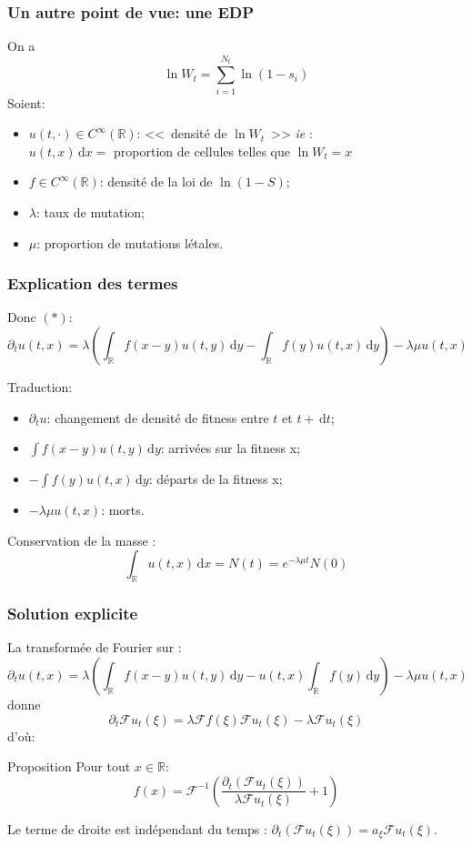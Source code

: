 \documentclass{beamer}
\newcommand{\prop}[1]{\begin{block}{Proposition}#1\end{block}}
\newcommand{\pth}[1]{\left(#1\right)}
\newcommand{\ie}{\emph{ie} }
\newcommand{\de}{\,\text{d}}
\newcommand{\Er}{\mathbb{R}}
\newcommand{\dr}{\partial}
\newcommand{\fr}{\mathcal{F}}
\begin{document}
\begin{frame}
  \frametitle{Un autre point de vue: une EDP}

  On a \[\ln W_t=\sum_{i=1}^{N_t}\ln(1-s_i)\]
  Soient:
\begin{itemize}[label=$\bullet$]
\item $u(t,\cdot)\in C^{\infty}(\Er)$: <<~densité de $\ln W_t$~>> \ie: \\$u(t,x)\de x=$ proportion de cellules telles que $\ln W_t=x$%
\item $f\in C^{\infty}(\Er)$: densité de la loi de $\ln(1-S)$;\vspace{0.5cm}\pause
\item $\lambda$: taux de mutation;
\item $\mu$: proportion de mutations létales.
\end{itemize}

\end{frame}
\begin{frame}
  \frametitle{Explication des termes}

Donc $(*)$:
\[\dr_tu(t,x)=\lambda\pth{\int_{\Er}f(x-y)u(t,y)\de y-\int_{\Er}f(y)u(t,x)\de y}-\lambda\mu u(t,x)\]

\vspace{0.5cm}

Traduction:
\begin{itemize}[label=$\bullet$]
\item $\dr_tu$: changement de densité de fitness entre $t$ et $t+\de t$;
\item $\int f(x-y)u(t,y)\de y$: arrivées sur la fitness x;
\item $-\int f(y)u(t,x)\de y$: départs de la fitness x;
\item $-\lambda\mu u(t,x)$: morts.
\end{itemize} 

\vspace{0.5cm}\pause

Conservation de la masse : $$\int_{\Er} u(t,x)\de x=N(t)=e^{-\lambda\mu t}N(0)$$

\end{frame}


\begin{frame}
  \frametitle{Solution explicite}
  La transformée de Fourier sur :
  \[\dr_tu(t,x)=\lambda\pth{\int_{\Er}f(x-y)u(t,y)\de y-u(t,x)\int_{\Er}f(y)\de y}-\lambda\mu u(t,x)\]
  donne
  \[\dr_t\fr u_t(\xi)=\lambda \fr f(\xi)\fr u_t(\xi)-\lambda\fr u_t(\xi)\]
  \pause
  d'où:
\prop{
    Pour tout $x\in\mathbb{R}$:
    \[f(x)=\fr^{-1}\pth{\frac{\dr_t\pth{\fr u_t(\xi)}}{\lambda\fr u_t(\xi)}+1}\]%
}
\pause
Le terme de droite est indépendant du temps : $\dr_t(\fr u_t(\xi))=a_{\xi}\fr u_t(\xi)$.

\end{frame}
\end{document}
